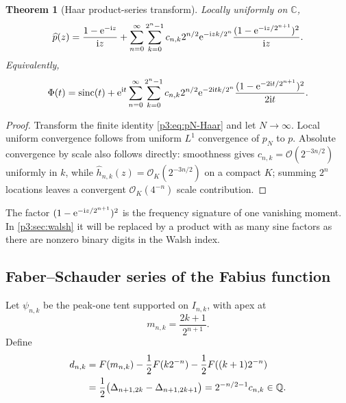 \documentclass[11pt]{article}
\newtheorem{theorem}{Theorem}[section]
\theoremstyle{definition}
\theoremstyle{remark}
\newcommand{\C}{\mathbb C}
\newcommand{\bigO}{\mathcal O}
\begin{document}
\begin{theorem}[Haar product-series transform]
\label{p3:thm:Haar-transform-series}
Locally uniformly on $\C$,
\begin{equation}\label{p3:eq:p-Haar-transform}
 \widehat p(z)=\frac{1-\mathrm e^{-\mathrm i z}}{\mathrm i z}
 +\sum_{n=0}^\infty\sum_{k=0}^{2^n-1}
 c_{n,k}2^{n/2}\mathrm e^{-\mathrm i zk/2^n}
 \frac{(1-\mathrm e^{-\mathrm i z/2^{n+1}})^2}{\mathrm i z}.
\end{equation}
Equivalently,
\begin{equation}\label{p3:eq:Phi-Haar-transform}
 \Phi(t)=\operatorname{sinc}(t)
 +\mathrm e^{\mathrm i t}\sum_{n=0}^\infty\sum_{k=0}^{2^n-1}
 c_{n,k}2^{n/2}\mathrm e^{-2\mathrm i tk/2^n}
 \frac{(1-\mathrm e^{-2\mathrm i t/2^{n+1}})^2}{2\mathrm i t}.
\end{equation}
\end{theorem}

\begin{proof}
Transform the finite identity \eqref{p3:eq:pN-Haar} and let $N\to\infty$.
Local uniform convergence follows from uniform $L^1$ convergence of $p_N$ to
$p$.  Absolute convergence by scale also follows directly: smoothness gives
$c_{n,k}=\bigO(2^{-3n/2})$ uniformly in $k$, while
$\widehat h_{n,k}(z)=\bigO_K(2^{-3n/2})$ on a compact $K$; summing $2^n$
locations leaves a convergent $\bigO_K(4^{-n})$ scale contribution.
\end{proof}

The factor $(1-\mathrm e^{-\mathrm i z/2^{n+1}})^2$ is the frequency signature of one
vanishing moment.  In \cref{p3:sec:walsh} it will be replaced by a product with as
many sine factors as there are nonzero binary digits in the Walsh index.

\subsection{Faber--Schauder series of the Fabius function}

Let $\psi_{n,k}$ be the peak-one tent supported on $I_{n,k}$, with apex at
\begin{equation}\label{p3:eq:Schauder-midpoint}
 m_{n,k}=\frac{2k+1}{2^{n+1}}.
\end{equation}
Define
\begin{align}
 d_{n,k}
 &=F(m_{n,k})-\frac12F(k2^{-n})-\frac12F((k+1)2^{-n})
 \label{p3:eq:d-Schauder-def}\\
 &=\frac12\bigl(\Delta_{n+1,2k}-\Delta_{n+1,2k+1}\bigr)
 =2^{-n/2-1}c_{n,k}\in\mathbb Q.
 \label{p3:eq:d-mass}
\end{align}
\end{document}
